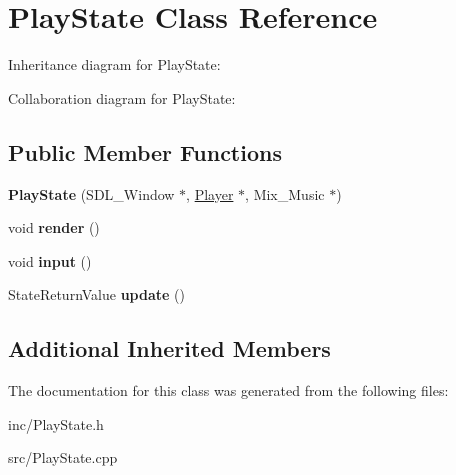 \hypertarget{class_play_state}{}\section{Play\+State Class Reference}
\label{class_play_state}


Inheritance diagram for Play\+State\+:


Collaboration diagram for Play\+State\+:
\subsection*{Public Member Functions}
\begin{DoxyCompactItemize}
\item 
\mbox{\label{class_play_state_a83c497e95d64db95dab2b49bc0605299}} 
{\bfseries Play\+State} (S\+D\+L\+\_\+\+Window $\ast$, \hyperlink{class_player}{Player} $\ast$, Mix\+\_\+\+Music $\ast$)
\item 
\mbox{\label{class_play_state_ad0b2654d0d822b853c6d06ee5c4a95c2}} 
void {\bfseries render} ()
\item 
\mbox{\label{class_play_state_ae039d253df129f2a5e9581a6c8db65f3}} 
void {\bfseries input} ()
\item 
\mbox{\label{class_play_state_a510c7945a8e827d39a4e7e1b525446a9}} 
State\+Return\+Value {\bfseries update} ()
\end{DoxyCompactItemize}
\subsection*{Additional Inherited Members}


The documentation for this class was generated from the following files\+:\begin{DoxyCompactItemize}
\item 
inc/Play\+State.\+h\item 
src/Play\+State.\+cpp\end{DoxyCompactItemize}
